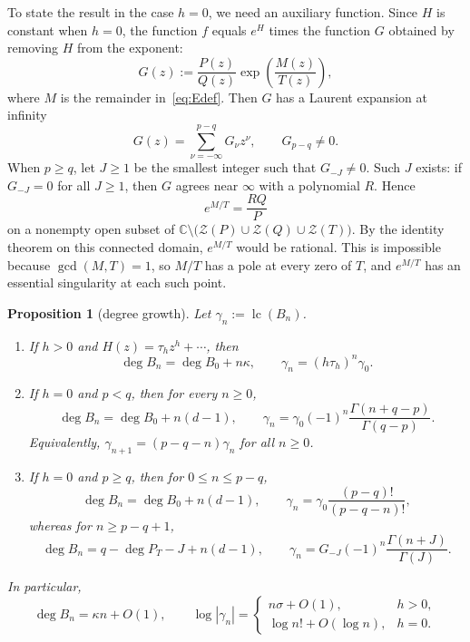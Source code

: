 \documentclass[reqno]{article}
\newtheorem{prop}[theorem]{Proposition}
\theoremstyle{definition}
\theoremstyle{remark}
\theoremstyle{plain}
\newcommand{\C}{\mathbb C}
\newcommand{\Z}{\mathcal Z}
\newcommand{\lc}{\operatorname{lc}}
\begin{document}
To state the result in the case $h=0$, we need an auxiliary function. Since $H$ is constant when $h=0$, the function $f$ equals $e^H$ times the function $G$ obtained by removing $H$ from the exponent:
\begin{equation}\label{eq:Gdef}
G(z):=\frac{P(z)}{Q(z)}\exp\!\left(\frac{M(z)}{T(z)}\right),
\end{equation}
where $M$ is the remainder in~\eqref{eq:Edef}. Then $G$ has a Laurent expansion at infinity
$$G(z)=\sum_{\nu=-\infty}^{p-q}G_\nu z^\nu,\qquad G_{p-q}\ne0.$$
When $p\ge q$, let $J\ge1$ be the smallest integer such that $G_{-J}\ne0$. Such $J$ exists: if $G_{-J}=0$ for all $J\ge1$, then $G$ agrees near $\infty$ with a polynomial $R$. Hence
$$e^{M/T}=\frac{RQ}{P}$$
on a nonempty open subset of $\C\setminus\bigl(\Z(P)\cup\Z(Q)\cup \Z(T)\bigr)$. By the identity theorem on this connected domain, $e^{M/T}$ would be rational. This is impossible because $\gcd(M,T)=1$, so $M/T$ has a pole at every zero of $T$, and $e^{M/T}$ has an essential singularity at each such point.

\begin{prop}[degree growth]\label{prop:deg}
Let $\gamma_n:=\lc(B_n)$.
\begin{enumerate}
\item\label{it:deg-h} If $h>0$ and $H(z)=\tau_h z^h+\cdots$, then
$$\deg B_n=\deg B_0+n\kappa,\qquad\gamma_n=(h\tau_h)^n\gamma_0.$$
\item\label{it:deg-plq} If $h=0$ and $p<q$, then for every $n\ge0$,
$$\deg B_n=\deg B_0+n(d-1),\qquad\gamma_n=\gamma_0(-1)^n\frac{\Gamma(n+q-p)}{\Gamma(q-p)}.$$
Equivalently, $\gamma_{n+1}=(p-q-n)\gamma_n$ for all $n\ge0$.
\item\label{it:deg-pgq} If $h=0$ and $p\ge q$, then for $0\le n\le p-q$,
$$\deg B_n=\deg B_0+n(d-1),\qquad\gamma_n=\gamma_0\frac{(p-q)!}{(p-q-n)!},$$
whereas for $n\ge p-q+1$,
$$\deg B_n=q-\deg P_T-J+n(d-1),\qquad\gamma_n=G_{-J}(-1)^n\frac{\Gamma(n+J)}{\Gamma(J)}.$$
\end{enumerate}
In particular,
\[
\deg B_n=\kappa n+O(1),\qquad
\log|\gamma_n|=
\begin{cases}
n\sigma+O(1), & h>0,\\
\log n!+O(\log n), & h=0.
\end{cases}
\]
\end{prop}
\end{document}
